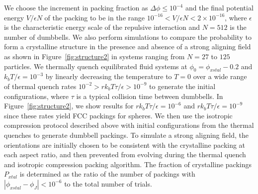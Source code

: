  We  choose the increment in packing fraction as $\Delta\phi\leq 10^{-4}$ and the final potential energy $V/\epsilon N$ of the packing to be in the range $10^{-16} < V/\epsilon N < 2\times 10^{-16}$, where $\epsilon$ is the characteristic energy scale of the repulsive interaction and $N=512$ is the number of dumbbells.
 We also perform simulations to compare the probability to form a crystalline structure in the presence and absence of a strong aligning field as shown in Figure~\ref{fig:structure2} in systems ranging from $N=27$ to $125$ particles.
 We thermally quench equilibrated fluid systems at $\phi_0 =\phi_{xstal}-0.2$ and $k_b T/\epsilon = 10^{-3}$ by linearly decreasing the temperature to $T = 0$ over a wide range of thermal quench rates $10^{-2} > r k_b T \tau/\epsilon > 10^{-9}$ to generate the initial configurations, where $\tau$ is a typical collision time between dumbbells.
 In Figure~\ref{fig:structure2}, we show results for $r k_b T \tau/\epsilon =10^{-6}$ and $r k_b T \tau/\epsilon =10^{-9}$ since these rates yield FCC packings for spheres.
 We then use the isotropic compression protocol described above with initial configurations from the thermal quenches to generate dumbbell packings.
 To simulate a strong aligning field, the orientations are initially chosen to be consistent with the crystalline packing at each aspect ratio, and then prevented from evolving during the thermal quench and isotropic compression packing algorithm.
 The fraction of crystalline packings $P_{xtal}$ is determined as the ratio of the number of packings with $|\phi_{xstal}-\phi_J| < 10^{-6}$ to the total number of trials.
 
